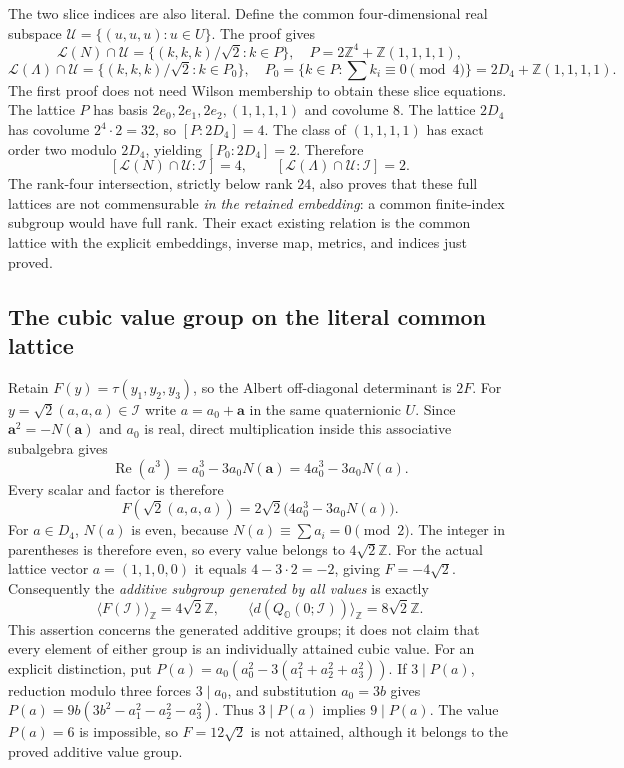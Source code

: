 The two slice indices are also literal. Define the common
four-dimensional real subspace
$\mathcal U=\{(u,u,u):u\in U\}$. The proof gives
\[
 \mathcal L(N)\cap\mathcal U
 =\{(k,k,k)/\sqrt2:k\in P\},\quad
 P=2\mathbb Z^4+\mathbb Z(1,1,1,1),
\]
\[
 \mathcal L(\Lambda)\cap\mathcal U
 =\{(k,k,k)/\sqrt2:k\in P_0\},\quad
 P_0=\{k\in P:\textstyle\sum k_i\equiv0\pmod4\}
     =2D_4+\mathbb Z(1,1,1,1).
\]
The first proof does not need Wilson membership to obtain these
slice equations. The lattice $P$ has basis
$2e_0,2e_1,2e_2,(1,1,1,1)$ and covolume $8$.
The lattice $2D_4$ has covolume $2^4\cdot2=32$, so
$[P:2D_4]=4$. The class of $(1,1,1,1)$ has exact order two
modulo $2D_4$, yielding $[P_0:2D_4]=2$. Therefore
\[
 [\mathcal L(N)\cap\mathcal U:\mathcal I]=4,\qquad
 [\mathcal L(\Lambda)\cap\mathcal U:\mathcal I]=2.
\]
The rank-four intersection, strictly below rank $24$, also proves
that these full lattices are not commensurable \emph{in the retained
embedding}: a common finite-index subgroup would have full rank.
Their exact existing relation is the common lattice with the
explicit embeddings, inverse map, metrics, and indices just proved.

\subsection{The cubic value group on the literal common lattice}
\label{wcl:sec:common-cubic}

Retain $F(y)=\tau(y_1,y_2,y_3)$, so the Albert off-diagonal
determinant is $2F$. For $y=\sqrt2(a,a,a)\in\mathcal I$ write
$a=a_0+\mathbf a$ in the same quaternionic $U$. Since
$\mathbf a^2=-N(\mathbf a)$ and $a_0$ is real, direct multiplication
inside this associative subalgebra gives
\[
 \operatorname{Re}(a^3)
 =a_0^3-3a_0N(\mathbf a)=4a_0^3-3a_0N(a).
\]
Every scalar and factor is therefore
\begin{equation}
 F(\sqrt2(a,a,a))
 =2\sqrt2\bigl(4a_0^3-3a_0N(a)\bigr).
 \label{wcl:eq:common-cubic}
\end{equation}
For $a\in D_4$, $N(a)$ is even, because
$N(a)\equiv\sum a_i=0\pmod2$. The integer in parentheses is
therefore even, so every value belongs to $4\sqrt2\mathbb Z$.
For the actual lattice vector $a=(1,1,0,0)$ it equals
$4-3\cdot2=-2$, giving $F=-4\sqrt2$.
Consequently the \emph{additive subgroup generated by all values}
is exactly
\[
 \bigl\langle F(\mathcal I)\bigr\rangle_{\mathbb Z}
       =4\sqrt2\mathbb Z,\qquad
 \bigl\langle d(Q_{\mathbb O}(0;\mathcal I))\bigr\rangle_{\mathbb Z}
       =8\sqrt2\mathbb Z.
\]
This assertion concerns the generated additive groups; it does not
claim that every element of either group is an individually attained
cubic value.
For an explicit distinction, put
$P(a)=a_0(a_0^2-3(a_1^2+a_2^2+a_3^2))$.
If $3\mid P(a)$, reduction modulo three forces $3\mid a_0$,
and substitution $a_0=3b$ gives
$P(a)=9b(3b^2-a_1^2-a_2^2-a_3^2)$.
Thus $3\mid P(a)$ implies $9\mid P(a)$.
The value $P(a)=6$ is impossible, so $F=12\sqrt2$ is not
attained, although it belongs to the proved additive value group.


